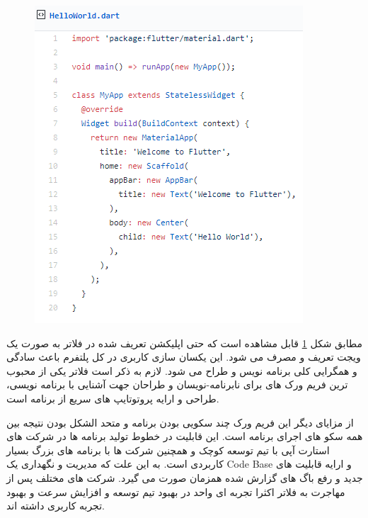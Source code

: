 \documentclass{CSICC2020}
\begin{document}
\begin{figure}[h!]
\centering\includegraphics[width=\linewidth]{Images/flutter-code}
\caption{}
\label{fig:FlutterCode}
\end{figure}

مطابق شکل \ref{fig:FlutterCode} قابل مشاهده است که حتی اپلیکشن تعریف شده در فلاتر به صورت یک ویجت تعریف و مصرف می شود.
این یکسان سازی کاربری در کل پلتفرم باعث سادگی و همگرایی کلی برنامه نویس و طراح می شود.
لازم به ذکر است فلاتر یکی از محبوب ترین فریم ورک های برای نابرنامه-نویسان  و طراحان جهت آشنایی با برنامه نویسی، طراحی و ارایه پروتوتایپ های سریع از برنامه است.

از مزایای دیگر این فریم ورک چند سکویی بودن برنامه و متحد الشکل بودن نتیجه بین همه سکو های اجرای برنامه است. این قابلیت در خطوط تولید برنامه ها در شرکت های استارت آپی با تیم توسعه کوچک و همچنین شرکت ها با برنامه های بزرگ بسیار کاربردی است. به این علت که مدیریت و نگهداری یک Code Base و ارایه قابلیت های جدید و رفع باگ های گزارش شده همزمان صورت می گیرد. شرکت های مختلف پس از مهاجرت به فلاتر اکثرا تجربه ای واحد در بهبود تیم توسعه و افزایش سرعت و بهبود تجربه کاربری داشته اند. \cite{flutter-story}
\end{document}
